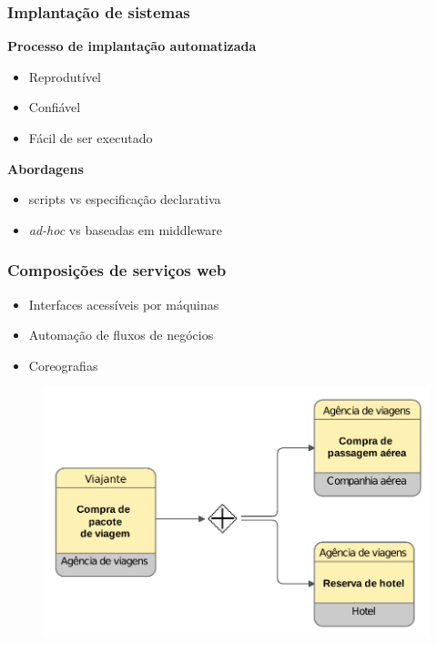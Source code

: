 \documentclass{beamer}
\newcommand\adhoc{\emph{ad-hoc}\xspace}
\newcommand\subtitulo[1]{{\large \textbf{#1}}}
\begin{document}

\begin{frame}
\frametitle{Implantação de sistemas}

\subtitulo{Processo de implantação automatizada}

\begin{itemize}
\item Reprodutível
\item Confiável
\item Fácil de ser executado
\end{itemize}

\subtitulo{Abordagens}

\begin{itemize}
\item scripts vs especificação declarativa
\item \adhoc vs baseadas em middleware
\end{itemize}


\end{frame}


\begin{frame}
\frametitle{Composições de serviços web}

\begin{itemize}
\item Interfaces acessíveis por máquinas
\item Automação de fluxos de negócios
\item Coreografias
\end{itemize}

\begin{figure}
\includegraphics[width=0.7\linewidth]{img/bpmn2}
\end{figure}


\end{frame}
\end{document}
